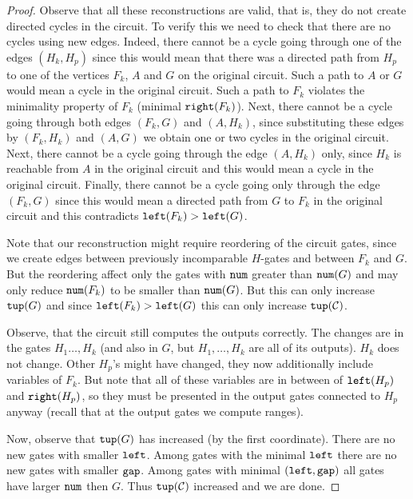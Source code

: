 \documentclass{toc}
\begin{document}
\begin{proof}[Proof]
    Observe that all these reconstructions are valid, that is, they do not create directed cycles in the circuit. To verify this we need to check that there are no cycles using new edges. Indeed, there cannot be a cycle going through one of the edges $(H_k,H_p)$ since this would mean that there was a directed path from $H_p$ to one of the vertices $F_k$, $A$ and $G$ on the original circuit. Such a path to $A$ or $G$ would mean a cycle in the original circuit. Such a path to $F_k$ violates the minimality property of $F_k$ (minimal $\texttt{right}(F_k)$). Next, there cannot be a cycle going through both edges $(F_k,G)$ and $(A,H_k)$, since substituting these edges by $(F_k,H_k)$ and $(A,G)$ we obtain one or two cycles in the original circuit. Next, there cannot be a cycle going through the edge $(A,H_k)$ only, since $H_k$ is reachable from $A$ in the original circuit and this would mean a cycle in the original circuit. Finally, there cannot be a cycle going only through the edge $(F_k,G)$ since this would mean a directed path from $G$ to $F_k$ in the original circuit and this contradicts $\texttt{left}(F_k)>\texttt{left}(G)$.

    Note that our reconstruction might require reordering of the circuit gates, since we create edges between previously incomparable $H$-gates and between $F_k$ and $G$. But the reordering affect only the gates with $\texttt{num}$ greater than $\texttt{num}(G)$ and may only reduce $\texttt{num}(F_k)$ to be smaller than $\texttt{num}(G)$. But this can only increase $\texttt{tup}(G)$ and since $\texttt{left}(F_k)>\texttt{left}(G)$ this can only increase $\texttt{tup}({\cal C})$.

    Observe, that the circuit still computes the outputs correctly. The changes are in the gates $H_1\ldots, H_k$ (and also in $G$, but $H_1,\ldots, H_k$ are all of its outputs). $H_k$ does not change. Other $H_p$'s might have changed, they now additionally include variables of $F_k$. But note that all of these variables are in between of $\texttt{left}(H_p)$ and $\texttt{right}(H_p)$, so they must be presented in the output gates connected to $H_p$ anyway (recall that at the output gates we compute ranges).

    Now, observe that $\texttt{tup}(G)$ has increased (by the first coordinate). There are no new gates with smaller $\texttt{left}$. Among gates with the minimal $\texttt{left}$ there are no new gates with smaller $\texttt{gap}$. Among gates with minimal $(\texttt{left},\texttt{gap})$ all gates have larger $\texttt{num}$ then $G$. Thus $\texttt{tup}({\cal C})$ increased and we are done.  %
\end{proof}
\end{document}
